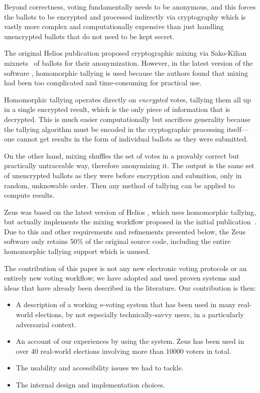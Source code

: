 \documentclass[letterpaper,10pt]{article}
\begin{document}
Beyond correctness, voting fundamentally needs to be anonymous,
and this forces the ballots to be encrypted and processed indirectly
via cryptography which is vastly more complex and computationally
expensive than just handling unencrypted ballots that do not need
to be kept secret.

The original Helios publication \cite{adida:2008} proposed
cryptographic mixing via Sako-Kilian mixnets~\cite{sako:1995} of
ballots for their anonymization. However, in the latest version of the
software \cite{Helios3}, homomorphic tallying \cite{Homomorphic} is
used because the authors found that mixing had been too complicated
and time-consuming for practical use.

Homomorphic tallying operates directly on \emph{encrypted} votes,
tallying them all up in a single encrypted result, which is the only
piece of information that is decrypted.
This is much easier computationally but sacrifices generality because
the tallying algorithm must be encoded in the cryptographic processing
itself---one cannot get results in the form of individual ballots as
they were submitted.

On the other hand, mixing shuffles the set of votes in a provably
correct but practically untraceable way, therefore anonymizing it.
The output is the same set of unencrypted ballots as they were before
encryption and submition, only in random, unknowable order.
Then any method of tallying can be applied to compute results.

Zeus was based on the latest version of Helios \cite{HeliosCode}, 
which uses homomorphic tallying, but actually implements the mixing
workflow proposed in the initial publication~\cite{adida:2008}.
Due to this and other requirements and refinements presented below,
the Zeus software only retains 50\% of the original source code,
including the entire homomorphic tallying support which is unused.

The contribution of this paper is not any new electronic voting
protocols or an entirely new voting workflow; we have adopted and used
proven systems and ideas that have already been described in the
literature. Our contribution is then:
\begin{itemize}
\item A description of a working e-voting system that has been used in
  many real-world elections, by not especially technically-savvy
  users, in a particularly adversarial context. 
\item An account of our experiences by using the system. Zeus has been
  used in over 40 real-world elections involving more than 10000
  voters in total.
\item The usability and accessibility issues we had to tackle.
\item The internal design and implementation choices.
\end{itemize}
\end{document}
